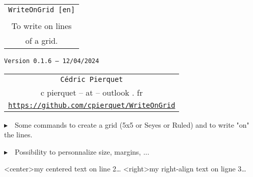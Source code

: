 \documentclass[a4paper]{article}
\def\TPversion{0.1.6}
\def\TPdate{12/04/2024}
\begin{document}
\pagestyle{fancy}

\thispagestyle{empty}

\vspace{2cm}

\begin{center}
	\begin{minipage}{0.75\linewidth}
	\begin{tcolorbox}[colframe=yellow,colback=yellow!15]
		\begin{center}
			\begin{tabular}{c}
				{\Huge \texttt{WriteOnGrid [en]}}\\
				\\
				{\LARGE To write on lines} \\
				{\LARGE of a grid.}
			\end{tabular}
			
			\medskip
			
			{\small \texttt{Version \TPversion{} -- \TPdate}}
		\end{center}
	\end{tcolorbox}
\end{minipage}
\end{center}

\vspace{0.5cm}

\begin{center}
	\begin{tabular}{c}
	\texttt{Cédric Pierquet}\\
	{\ttfamily c pierquet -- at -- outlook . fr}\\
	\texttt{\url{https://github.com/cpierquet/WriteOnGrid}}
\end{tabular}
\end{center}

\vspace{0.5cm}

{$\blacktriangleright$~~Some commands to create a grid (5x5 or Seyes or Ruled) and to write "on" the lines.}

\smallskip

{$\blacktriangleright$~~Possibility to personnalize size, margins, ...}

\vspace{1cm}

\begin{center}
	\begin{EnvGrid}[NumSquares=22x8]
	\WriteLine<center>{my centered text on line 2\ldots}
	\WriteLine<right>{my right-align text on ligne 3\ldots}
	\PassLine
\end{EnvGrid}
\end{center}
\end{document}
